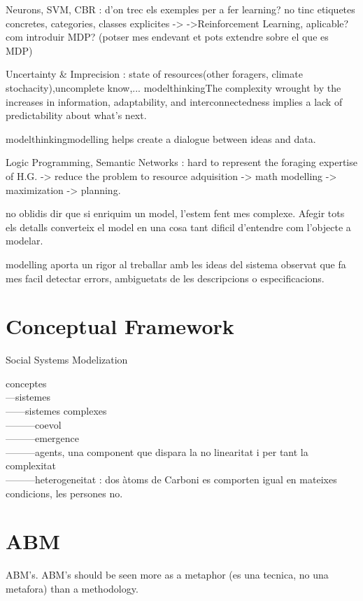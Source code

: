 \documentclass{report}
\begin{document}
Neurons, SVM, CBR : d'on trec els exemples per a fer learning? no tinc etiquetes concretes, categories, classes expli­cites ->
->Reinforcement Learning, aplicable?
com introduir MDP? (potser mes endevant et pots extendre sobre el que es MDP)

Uncertainty \& Imprecision : state of resources(other foragers, climate stochacity),uncomplete know,... 
modelthinking{The complexity wrought by the increases in information, adaptability, and interconnectedness implies a lack of predictability about what's next}.

modelthinking{modelling helps create a dialogue between ideas and data}.

Logic Programming, Semantic Networks : hard to represent the foraging expertise of H.G. -> reduce the problem to 
resource adquisition -> math modelling -> maximization -> planning.

no oblidis dir que si enriquim un model, l'estem fent mes complexe. Afegir tots els detalls
converteix el model en una cosa tant difi­cil d'entendre com l'objecte a modelar.

modelling aporta un rigor al treballar amb les ideas del sistema observat que fa mes facil detectar errors, ambiguetats de les descripcions o especificacions. 

\section{Conceptual Framework}{Social Systems Modelization}

conceptes\\
---sistemes\\
------sistemes complexes\\
---------coevol \\
---------emergence\\
---------agents, una component que dispara la no linearitat i per tant la complexitat\\
---------heterogeneitat : dos \`atoms de Carboni es comporten igual en mateixes condicions, les persones no.\\

	\section{ABM}

ABM's. ABM's should be seen more as a metaphor (es una tecnica, no una metafora) than a methodology.
\end{document}
